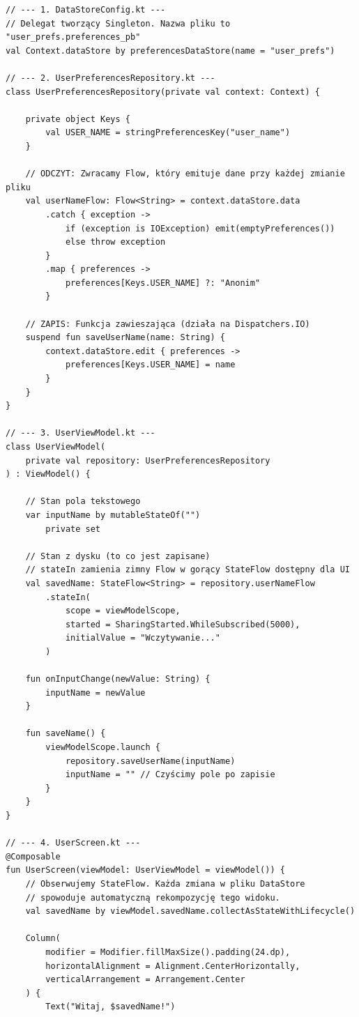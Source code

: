 \begin{verbatim}
// --- 1. DataStoreConfig.kt ---
// Delegat tworzący Singleton. Nazwa pliku to "user_prefs.preferences_pb"
val Context.dataStore by preferencesDataStore(name = "user_prefs")

// --- 2. UserPreferencesRepository.kt ---
class UserPreferencesRepository(private val context: Context) {
    
    private object Keys {
        val USER_NAME = stringPreferencesKey("user_name")
    }

    // ODCZYT: Zwracamy Flow, który emituje dane przy każdej zmianie pliku
    val userNameFlow: Flow<String> = context.dataStore.data
        .catch { exception ->
            if (exception is IOException) emit(emptyPreferences()) 
            else throw exception
        }
        .map { preferences ->
            preferences[Keys.USER_NAME] ?: "Anonim"
        }

    // ZAPIS: Funkcja zawieszająca (działa na Dispatchers.IO)
    suspend fun saveUserName(name: String) {
        context.dataStore.edit { preferences ->
            preferences[Keys.USER_NAME] = name
        }
    }
}

// --- 3. UserViewModel.kt ---
class UserViewModel(
    private val repository: UserPreferencesRepository
) : ViewModel() {

    // Stan pola tekstowego
    var inputName by mutableStateOf("")
        private set

    // Stan z dysku (to co jest zapisane)
    // stateIn zamienia zimny Flow w gorący StateFlow dostępny dla UI
    val savedName: StateFlow<String> = repository.userNameFlow
        .stateIn(
            scope = viewModelScope,
            started = SharingStarted.WhileSubscribed(5000),
            initialValue = "Wczytywanie..."
        )

    fun onInputChange(newValue: String) {
        inputName = newValue
    }

    fun saveName() {
        viewModelScope.launch {
            repository.saveUserName(inputName)
            inputName = "" // Czyścimy pole po zapisie
        }
    }
}

// --- 4. UserScreen.kt ---
@Composable
fun UserScreen(viewModel: UserViewModel = viewModel()) {
    // Obserwujemy StateFlow. Każda zmiana w pliku DataStore
    // spowoduje automatyczną rekompozycję tego widoku.
    val savedName by viewModel.savedName.collectAsStateWithLifecycle()

    Column(
        modifier = Modifier.fillMaxSize().padding(24.dp),
        horizontalAlignment = Alignment.CenterHorizontally,
        verticalArrangement = Arrangement.Center
    ) {
        Text("Witaj, $savedName!")
        

\end{verbatim}
